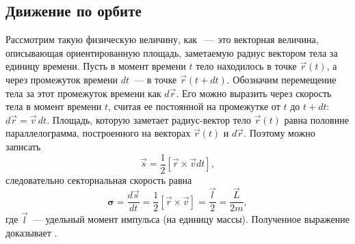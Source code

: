 \subsection{Движение по орбите}
\begin{figure}[t]
	\centering
	\caption{}
\end{figure}

Рассмотрим такую физическую величину, как ~--- это векторная величина, описывающая ориентированную площадь, заметаемую радиус вектором тела за единицу времени. Пусть в момент времени $t$ тело находилось в точке $\vec{r}(t)$, а через промежуток времени $dt$~--- в точке $\vec{r}(t + dt)$. Обозначим перемещение тела за этот промежуток времени как $d\vec{r}$. Его можно выразить через скорость тела в момент времени $t$, считая ее постоянной на промежутке от $t$ до $t + dt$: $d\vec{r} = \vec{v} \,d t$. Площадь, которую заметает радиус-вектор тело $\vec{r}(t)$ равна половине параллелограмма, построенного на векторах $\vec{r}(t)$ и $d\vec{r}$. Поэтому можно записать
\begin{equation*}
	\vec{s} = \frac{1}{2} [\vec{r} \times \vec{v} dt],
\end{equation*}
следовательно секториальная скорость равна
\begin{equation*}
	\boldsymbol{\sigma} = \frac{d \vec{s}}{dt} = \frac{1}{2} [\vec{r} \times \vec{v}] = \frac{\vec{l}}{2} = \frac{\vec{L}}{2m},
\end{equation*}
где $\vec{l}$~--- удельный момент импульса (на единицу массы). Полученное выражение доказывает .

